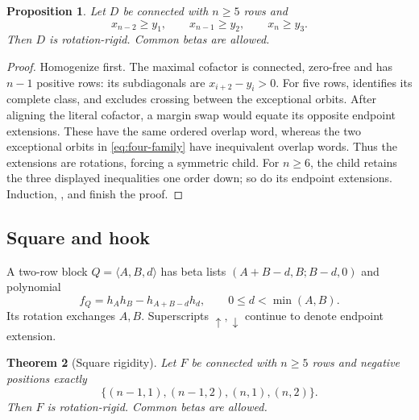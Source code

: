 \documentclass[11pt,a4paper]{amsart}
\numberwithin{equation}{section}
\theoremstyle{plain}
\newtheorem{theorem}{Theorem}[section]
\newtheorem{proposition}[theorem]{Proposition}
\theoremstyle{definition}
\begin{document}
\begin{proposition}\label{prop:three-corners}
Let \(D\) be connected with \(n\ge5\) rows and
\[
 x_{n-2}\ge y_1,\qquad x_{n-1}\ge y_2,\qquad x_n\ge y_3.
\]
Then \(D\) is rotation-rigid.  Common betas are allowed.
\end{proposition}

\begin{proof}
Homogenize first.  The maximal cofactor is connected, zero-free and has
\(n-1\) positive rows: its subdiagonals are \(x_{i+2}-y_i>0\).
For five rows,  identifies its complete class, and
 excludes crossing between the exceptional orbits.
After aligning the literal cofactor, a margin swap would equate its
opposite endpoint extensions.  These have the same ordered overlap word,
whereas the two exceptional orbits in \eqref{eq:four-family} have
inequivalent overlap words.  Thus the extensions are rotations, forcing a
symmetric child.  For \(n\ge6\), the child retains the three displayed
inequalities one order down; so do its endpoint extensions.  Induction,
, and  finish the proof.
\end{proof}

\subsection{Square and hook}

A two-row block \(Q=\langle A,B,d\rangle\) has beta lists
\((A+B-d,B;B-d,0)\) and polynomial
\[
 f_Q=h_Ah_B-h_{A+B-d}h_d,\qquad 0\le d<\min(A,B).
\]
Its rotation exchanges \(A,B\).  Superscripts \(\uparrow,\downarrow\)
continue to denote endpoint extension.

\begin{theorem}[Square rigidity]\label{thm:square}
Let \(F\) be connected with \(n\ge5\) rows and negative positions exactly
\[
 \{(n-1,1),(n-1,2),(n,1),(n,2)\}.
\]
Then \(F\) is rotation-rigid.  Common betas are allowed.
\end{theorem}
\end{document}
